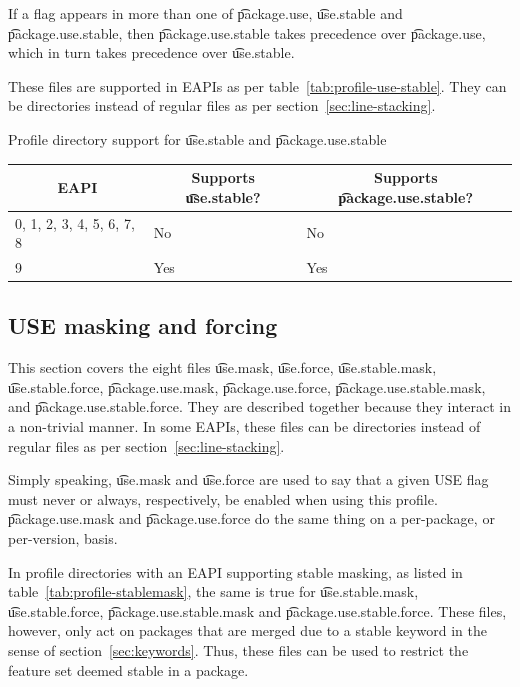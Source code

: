 If a flag appears in more than one of \t{package.use}, \t{use.stable} and \t{package.use.stable},
then \t{package.use.stable} takes precedence over \t{package.use}, which in turn takes precedence
over \t{use.stable}.

These files are supported in EAPIs as per table~\ref{tab:profile-use-stable}. They can be
directories instead of regular files as per section~\ref{sec:line-stacking}.

\begin{centertable}{Profile directory support for \t{use.stable} and \t{package.use.stable}}
    \label{tab:profile-use-stable}
    \begin{tabular}{lll}
      \toprule
      \multicolumn{1}{c}{\textbf{EAPI}} &
      \multicolumn{1}{c}{\textbf{Supports \t{use.stable}?}} &
      \multicolumn{1}{c}{\textbf{Supports \t{package.use.stable}?}} \\
      \midrule
      0, 1, 2, 3, 4, 5, 6, 7, 8 & No  & No  \\
      9                         & Yes & Yes \\
      \bottomrule
    \end{tabular}
\end{centertable}

\subsection{USE masking and forcing}
\label{sec:use-masking}
This section covers the eight files \t{use.mask}, \t{use.force}, \t{use.stable.mask},
\t{use.stable.force}, \t{package.use.mask}, \t{package.use.force}, \t{package.use.stable.mask},
and \t{package.use.\allowbreak stable.force}. They are described together because they interact in
a non-trivial manner. In some EAPIs, these files can be directories instead of regular files as per
section~\ref{sec:line-stacking}.

Simply speaking, \t{use.mask} and \t{use.force} are used to say that a given USE flag must never or
always, respectively, be enabled when using this profile. \t{package.use.mask} and
\t{package.use.force} do the same thing on a per-package, or per-version, basis.

In profile directories with an EAPI supporting stable masking, as listed in
table~\ref{tab:profile-stablemask}, the same is true for \t{use.stable.mask}, \t{use.stable.force},
\t{package.use.stable.mask} and \t{package.use.\allowbreak stable.force}. These files, however,
only act on packages that are merged due to a stable keyword in the sense of
section~\ref{sec:keywords}. Thus, these files can be used to restrict the feature set deemed
stable in a package.

